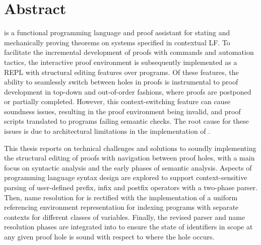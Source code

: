 \chapter*{Abstract}

\Beluga is a functional programming language and proof assistant for stating and mechanically proving theorems on systems specified in contextual \acs{LF}.
To facilitate the incremental development of proofs with commands and automation tactics, the \Harpoon interactive proof environment is subsequently implemented as a \acs{REPL} with structural editing features over \Beluga programs.
Of these features, the ability to seamlessly switch between holes in proofs is instrumental to proof development in top-down and out-of-order fashions, where proofs are postponed or partially completed.
However, this context-switching feature can cause soundness issues, resulting in the proof environment being invalid, and proof scripts translated to \Beluga programs failing semantic checks.
The root cause for these issues is due to architectural limitations in the implementation of \Beluga.

This thesis reports on technical challenges and solutions to soundly implementing the structural editing of proofs with navigation between proof holes, with a main focus on syntactic analysis and the early phases of semantic analysis.
Aspects of programming language syntax design are explored to support context-sensitive parsing of user-defined prefix, infix and postfix operators with a two-phase parser.
Then, name resolution for \Beluga is rectified with the implementation of a uniform referencing environment representation for indexing programs with separate contexts for different classes of variables.
Finally, the revised parser and name resolution phases are integrated into \Harpoon to ensure the state of identifiers in scope at any given proof hole is sound with respect to where the hole occurs.
